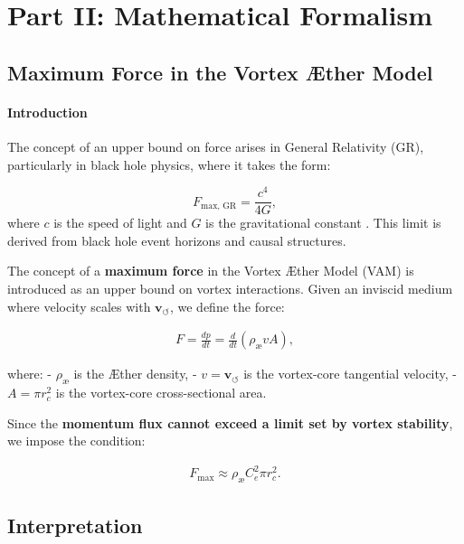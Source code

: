 \documentclass[a4paper,12pt]{article}
\begin{document}
    \newpage \section*{Part II: Mathematical Formalism}\label{sec:Part-2} %


\subsection{Maximum Force in the Vortex Æther Model}


\paragraph*{Introduction}
The concept of an upper bound on force arises in General Relativity (GR), particularly in black hole physics, where it takes the form:


\begin{equation*}
    F_\text{max, GR} = \frac{c^4}{4G},
\end{equation*}
where $c$ is the speed of light and $G$ is the gravitational constant \cite{Schiller2006}. This limit is derived from black hole event horizons and causal structures.


The concept of a \textbf{maximum force} in the Vortex Æther Model (VAM) is introduced as an upper bound on vortex interactions. Given an inviscid medium where velocity scales with \( \mathbf{v}_{\scriptscriptstyle\boldsymbol{\circlearrowleft}} \), we define the force:

\begin{align}
    F = \frac{dp}{dt} = \frac{d}{dt} (\rho_{\text{\ae}} v A),
\end{align}

where:
- \( \rho_{\text{\ae}} \) is the Æther density,
- \( v = \mathbf{v}_{\scriptscriptstyle\boldsymbol{\circlearrowleft}} \) is the vortex-core tangential velocity,
- \( A = \pi r_c^2 \) is the vortex-core cross-sectional area.

Since the \textbf{momentum flux cannot exceed a limit set by vortex stability}, we impose the condition:

\begin{align}
    F_{\max} \approx \rho_{\text{\ae}} C_e^2 \pi r_c^2.
\end{align}

\subsection{Interpretation}
\end{document}
